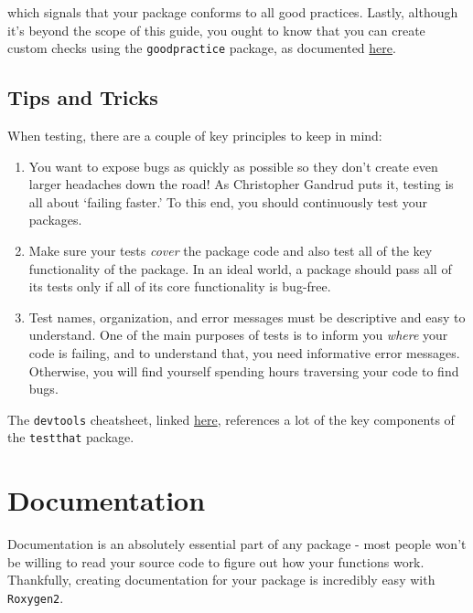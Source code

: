 \documentclass[]{book}
\providecommand{\tightlist}{%
  \setlength{\itemsep}{0pt}\setlength{\parskip}{0pt}}
\begin{document}
which signals that your package conforms to all good practices. Lastly,
although it's beyond the scope of this guide, you ought to know that you
can create custom checks using the \texttt{goodpractice} package, as
documented
\href{https://github.com/MangoTheCat/goodpractice/blob/master/vignettes/custom_checks.Rmd}{here}.

\subsection{Tips and Tricks}\label{tips-and-tricks}

When testing, there are a couple of key principles to keep in mind:

\begin{enumerate}
\def\labelenumi{\arabic{enumi}.}
\tightlist
\item
  You want to expose bugs as quickly as possible so they don't create
  even larger headaches down the road! As Christopher Gandrud puts it,
  testing is all about `failing faster.' To this end, you should
  continuously test your packages.
\item
  Make sure your tests \emph{cover} the package code and also test all
  of the key functionality of the package. In an ideal world, a package
  should pass all of its tests only if all of its core functionality is
  bug-free.
\item
  Test names, organization, and error messages must be descriptive and
  easy to understand. One of the main purposes of tests is to inform you
  \emph{where} your code is failing, and to understand that, you need
  informative error messages. Otherwise, you will find yourself spending
  hours traversing your code to find bugs.
\end{enumerate}

The \texttt{devtools} cheatsheet, linked
\href{https://www.rstudio.com/wp-content/uploads/2015/03/devtools-cheatsheet.pdf}{here},
references a lot of the key components of the \texttt{testthat} package.

\section{Documentation}\label{documentation}

Documentation is an absolutely essential part of any package - most
people won't be willing to read your source code to figure out how your
functions work. Thankfully, creating documentation for your package is
incredibly easy with \texttt{Roxygen2}.
\end{document}
